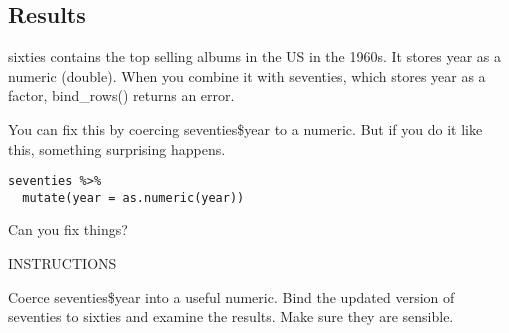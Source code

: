 \documentclass[]{article}
\newenvironment{Shaded}{\begin{snugshade}}{\end{snugshade}}
\newcommand{\KeywordTok}[1]{\textcolor[rgb]{0.13,0.29,0.53}{\textbf{#1}}}
\newcommand{\DataTypeTok}[1]{\textcolor[rgb]{0.13,0.29,0.53}{#1}}
\newcommand{\StringTok}[1]{\textcolor[rgb]{0.31,0.60,0.02}{#1}}
\newcommand{\CommentTok}[1]{\textcolor[rgb]{0.56,0.35,0.01}{\textit{#1}}}
\newcommand{\OperatorTok}[1]{\textcolor[rgb]{0.81,0.36,0.00}{\textbf{#1}}}
\newcommand{\NormalTok}[1]{#1}
\begin{document}
\subsection{Results}\label{results}

sixties contains the top selling albums in the US in the 1960s. It
stores year as a numeric (double). When you combine it with seventies,
which stores year as a factor, bind\_rows() returns an error.

You can fix this by coercing seventies\$year to a numeric. But if you do
it like this, something surprising happens.

\begin{verbatim}
seventies %>% 
  mutate(year = as.numeric(year))
\end{verbatim}

Can you fix things?

INSTRUCTIONS

Coerce seventies\$year into a useful numeric. Bind the updated version
of seventies to sixties and examine the results. Make sure they are
sensible.

\begin{Shaded}
\end{Shaded}
\end{document}
